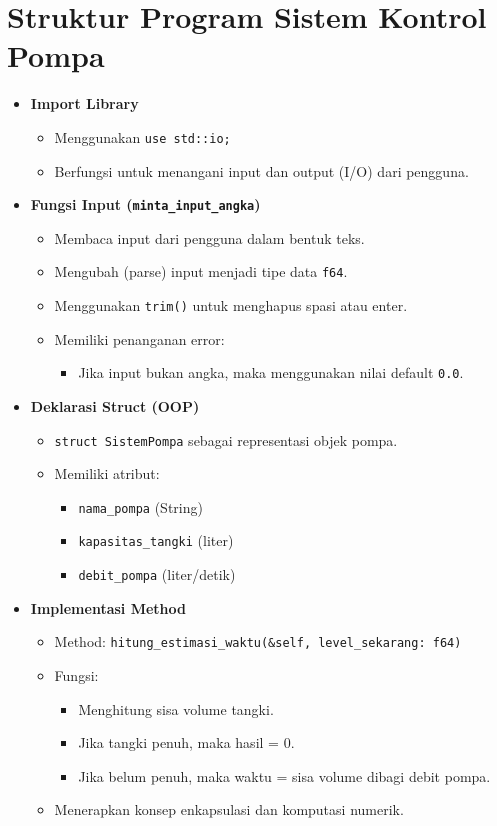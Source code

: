 \documentclass[12pt,a4paper]{article}
\begin{document}
\section{Struktur Program Sistem Kontrol Pompa}

\begin{itemize}

\item \textbf{Import Library}
\begin{itemize}
    \item Menggunakan \texttt{use std::io;}
    \item Berfungsi untuk menangani input dan output (I/O) dari pengguna.
\end{itemize}

\item \textbf{Fungsi Input (\texttt{minta\_input\_angka})}
\begin{itemize}
    \item Membaca input dari pengguna dalam bentuk teks.
    \item Mengubah (parse) input menjadi tipe data \texttt{f64}.
    \item Menggunakan \texttt{trim()} untuk menghapus spasi atau enter.
    \item Memiliki penanganan error:
    \begin{itemize}
        \item Jika input bukan angka, maka menggunakan nilai default \texttt{0.0}.
    \end{itemize}
\end{itemize}

\item \textbf{Deklarasi Struct (OOP)}
\begin{itemize}
    \item \texttt{struct SistemPompa} sebagai representasi objek pompa.
    \item Memiliki atribut:
    \begin{itemize}
        \item \texttt{nama\_pompa} (String)
        \item \texttt{kapasitas\_tangki} (liter)
        \item \texttt{debit\_pompa} (liter/detik)
    \end{itemize}
\end{itemize}

\item \textbf{Implementasi Method}
\begin{itemize}
    \item Method: \texttt{hitung\_estimasi\_waktu(\&self, level\_sekarang: f64)}
    \item Fungsi:
    \begin{itemize}
        \item Menghitung sisa volume tangki.
        \item Jika tangki penuh, maka hasil = 0.
        \item Jika belum penuh, maka waktu = sisa volume dibagi debit pompa.
    \end{itemize}
    \item Menerapkan konsep enkapsulasi dan komputasi numerik.
\end{itemize}


\end{itemize}
\end{document}
